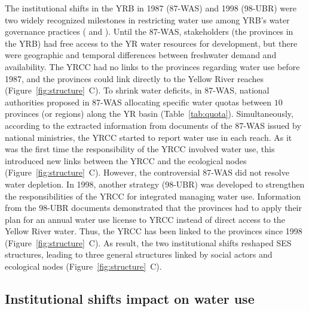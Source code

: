 \documentclass[default, sn-standardnature]{sn-jnl}
\begin{document}
The institutional shifts in the YRB in 1987 (87-WAS) and 1998 (98-UBR) were two widely recognized milestones in restricting water use among YRB's water governance practices (\textit{} and \textit{}).
Until the 87-WAS, stakeholders (the provinces in the YRB) had free access to the YR water resources for development, but there were geographic and temporal differences between freshwater demand and availability.
The YRCC had no links to the provinces regarding water use before 1987, and the provinces could link directly to the Yellow River reaches (Figure~\ref{fig:structure}~C).
To shrink water deficits, in 87-WAS, national authorities proposed in 87-WAS allocating specific water quotas between $10$ provinces (or regions) along the YR basin (Table~\ref{tab:quota}).
Simultaneously, according to the extracted information from documents of the 87-WAS issued by national ministries, the YRCC started to report water use in each reach.
As it was the first time the responsibility of the YRCC involved water use, this introduced new links between the YRCC and the ecological nodes (Figure~\ref{fig:structure}~C).
However, the controversial 87-WAS did not resolve water depletion.
In 1998, another strategy (98-UBR) was developed to strengthen the responsibilities of the YRCC for integrated managing water use.
Information from the 98-UBR documents demonstrated that the provinces had to apply their plan for an annual water use license to YRCC instead of direct access to the Yellow River water.
Thus, the YRCC has been linked to the provinces since 1998 (Figure~\ref{fig:structure}~C).
As result, the two institutional shifts reshaped SES structures, leading to three general structures linked by social actors and ecological nodes (Figure~\ref{fig:structure}~C).


\subsection{Institutional shifts impact on water use}
\label{result-2}
\end{document}
